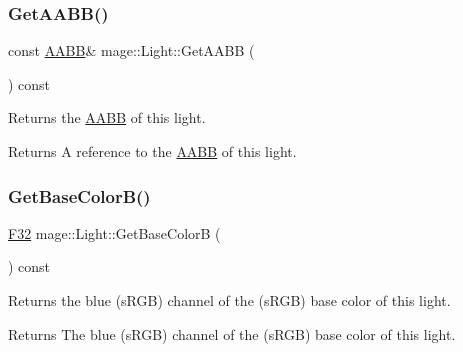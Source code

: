\hypertarget{classmage_1_1_light_a1ce1d4a97857b182e629e0e546beb280}{}\label{classmage_1_1_light_a1ce1d4a97857b182e629e0e546beb280} 
\subsubsection{\texorpdfstring{Get\+A\+A\+B\+B()}{GetAABB()}}
{\footnotesize\ttfamily const \hyperlink{structmage_1_1_a_a_b_b}{A\+A\+BB}\& mage\+::\+Light\+::\+Get\+A\+A\+BB (\begin{DoxyParamCaption}{ }\end{DoxyParamCaption}) const\hspace{0.3cm}{\ttfamily [noexcept]}}

Returns the \hyperlink{structmage_1_1_a_a_b_b}{A\+A\+BB} of this light.

\begin{DoxyReturn}{Returns}
A reference to the \hyperlink{structmage_1_1_a_a_b_b}{A\+A\+BB} of this light. 
\end{DoxyReturn}
\hypertarget{classmage_1_1_light_ad81ae07280a6ef9d32c18bb473d25a04}{}\label{classmage_1_1_light_ad81ae07280a6ef9d32c18bb473d25a04} 
\subsubsection{\texorpdfstring{Get\+Base\+Color\+B()}{GetBaseColorB()}}
{\footnotesize\ttfamily \hyperlink{namespacemage_aa97e833b45f06d60a0a9c4fc22ae02c0}{F32} mage\+::\+Light\+::\+Get\+Base\+ColorB (\begin{DoxyParamCaption}{ }\end{DoxyParamCaption}) const\hspace{0.3cm}{\ttfamily [noexcept]}}

Returns the blue (s\+R\+GB) channel of the (s\+R\+GB) base color of this light.

\begin{DoxyReturn}{Returns}
The blue (s\+R\+GB) channel of the (s\+R\+GB) base color of this light. 
\end{DoxyReturn}
\hypertarget{classmage_1_1_light_a85e946ea46ac1ba19e980a76374ff8a2}{}\label{classmage_1_1_light_a85e946ea46ac1ba19e980a76374ff8a2} 

